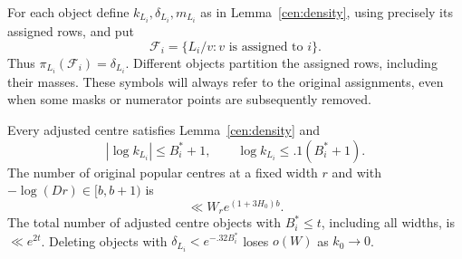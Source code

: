 For each object define $k_{L_i},\delta_{L_i},m_{L_i}$ as in
Lemma~\ref{cen:density}, using precisely its assigned rows, and put
\[
 \mathcal F_i=\{L_i/v:v\text{ is assigned to }i\}.
\]
Thus $\pi_{L_i}(\mathcal F_i)=\delta_{L_i}$. Different objects
partition the assigned rows, including their masses. These symbols
will always refer to the original assignments, even when some masks
or numerator points are subsequently removed.

\begin{lemma}
\label{cen:adjusted}
Every adjusted centre satisfies Lemma~\ref{cen:density} and
\[
 |\log k_{L_i}|\le B_i^*+1,\qquad
 \log k_{L_i}\le .1(B_i^*+1).
\]
The number of original popular centres at a fixed width $r$ and with
$-\log(Dr)\in[b,b+1)$ is
\[
 \ll W_r e^{(1+3H_0)b}.
\]
The total number of adjusted centre objects with $B_i^*\le t$,
including all widths, is $\ll e^{2t}$. Deleting objects with
$\delta_{L_i}<e^{-.32B_i^*}$ loses $o(W)$ as $k_0\to0$.
\end{lemma}

